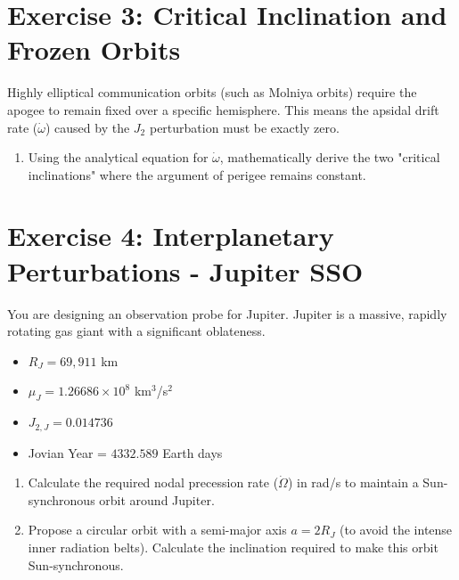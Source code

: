 \documentclass[12pt, letterpaper]{article}
\begin{document}
\section*{Exercise 3: Critical Inclination and Frozen Orbits}
Highly elliptical communication orbits (such as Molniya orbits) require the apogee to remain fixed over a specific hemisphere. This means the apsidal drift rate ($\dot{\omega}$) caused by the $J_2$ perturbation must be exactly zero.
\begin{enumerate}
    \item[a)] Using the analytical equation for $\dot{\omega}$, mathematically derive the two "critical inclinations" where the argument of perigee remains constant.
\end{enumerate}

\section*{Exercise 4: Interplanetary Perturbations - Jupiter SSO}
You are designing an observation probe for Jupiter. Jupiter is a massive, rapidly rotating gas giant with a significant oblateness.
\begin{itemize}
    \item $R_J = 69,911$ km
    \item $\mu_J = 1.26686 \times 10^8$ km$^3$/s$^2$
    \item $J_{2,J} = 0.014736$
    \item Jovian Year = $4332.589$ Earth days
\end{itemize}
\begin{enumerate}
    \item[a)] Calculate the required nodal precession rate ($\dot{\Omega}$) in rad/s to maintain a Sun-synchronous orbit around Jupiter.
    \item[b)] Propose a circular orbit with a semi-major axis $a = 2 R_J$ (to avoid the intense inner radiation belts). Calculate the inclination required to make this orbit Sun-synchronous.
\end{enumerate}
\end{document}
